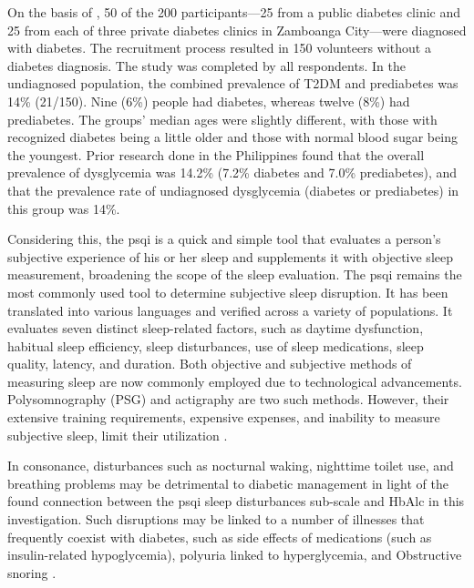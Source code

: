 On the basis of \textcite{agarwal-2019}, 50 of the 200 participants—25 from a
public diabetes clinic and 25 from each of three private diabetes clinics in
Zamboanga City—were diagnosed with diabetes. The recruitment process resulted in
150 volunteers without a diabetes diagnosis. The study was completed by all
respondents. In the undiagnosed population, the combined prevalence of T2DM and
prediabetes was 14\% (21/150). Nine (6\%) people had diabetes, whereas twelve
(8\%) had prediabetes. The groups' median ages were slightly different, with
those with recognized diabetes being a little older and those with normal blood
sugar being the youngest. Prior research done in the Philippines found that the
overall prevalence of dysglycemia was 14.2\% (7.2\% diabetes and 7.0\%
prediabetes), and that the prevalence rate of undiagnosed dysglycemia (diabetes
or prediabetes) in this group was 14\%.

Considering this, the \ac{psqi} is a quick and
simple tool that evaluates a person's subjective experience of his or her sleep
and supplements it with objective sleep measurement, broadening the scope of the
sleep evaluation. The \ac{psqi} remains the most commonly used tool to determine
subjective sleep disruption. It has been translated into various languages and
verified across a variety of populations. It evaluates seven distinct
sleep-related factors, such as daytime dysfunction, habitual sleep efficiency,
sleep disturbances, use of sleep medications, sleep quality, latency, and
duration. Both objective and subjective methods of measuring sleep are now
commonly employed due to technological advancements. Polysomnography (PSG) and
actigraphy are two such methods. However, their extensive training requirements,
expensive expenses, and inability to measure subjective sleep, limit their
utilization \parencite{zhu-2018}.

In consonance, disturbances such as nocturnal waking, nighttime toilet use, and
breathing problems may be detrimental to diabetic management in light of the
found connection between the \ac{psqi} sleep disturbances sub-scale and HbAlc in this
investigation. Such disruptions may be linked to a number of illnesses that
frequently coexist with diabetes, such as side effects of medications (such as
insulin-related hypoglycemia), polyuria linked to hyperglycemia, and Obstructive
snoring \parencite{telford-2018}.

